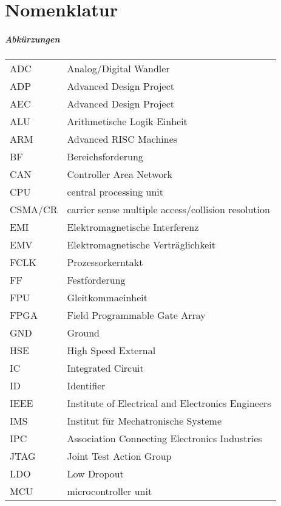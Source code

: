 \chapter*{Nomenklatur}
\paragraph{Abk\"urzungen}
\begin{table}[H]
	\centering
		\begin{tabular}{p{2cm}p{15cm}}
			ADC \dotfill & Analog/Digital Wandler\\
			ADP \dotfill & Advanced Design Project\\
			AEC \dotfill & Advanced Design Project\\
			ALU \dotfill & Arithmetische Logik Einheit\\
			ARM\dotfill & Advanced RISC Machines\\
			BF\dotfill & Bereichsforderung\\
			CAN\dotfill & Controller Area Network\\
			CPU\dotfill & central processing unit\\
			CSMA/CR\dotfill & carrier sense multiple access/collision resolution\\
			EMI\dotfill & Elektromagnetische Interferenz\\
			EMV\dotfill & Elektromagnetische Verträglichkeit\\
			FCLK\dotfill & Prozessorkerntakt\\
			FF\dotfill & Festforderung\\
			FPU\dotfill & Gleitkommaeinheit\\
			FPGA\dotfill & Field Programmable Gate Array\\
			GND\dotfill & Ground\\
			HSE\dotfill & High Speed External\\
			IC\dotfill & Integrated Circuit\\
			ID\dotfill & Identifier\\
			IEEE\dotfill & Institute of Electrical and Electronics Engineers\\
			IMS\dotfill & Institut für Mechatronische Systeme\\
			IPC\dotfill & Association Connecting Electronics Industries\\
			JTAG\dotfill & Joint Test Action Group\\
			LDO\dotfill & Low Dropout\\
			MCU\dotfill & microcontroller unit\\

\end{tabular}
\end{table}
